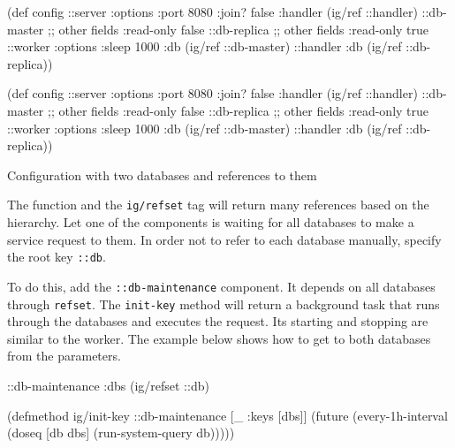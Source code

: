 \begin{listing}[ht!]

\ifnarrow

\begin{english}
  \begin{clojure}
(def config
  {::server {:options {:port 8080
                       :join? false}
             :handler (ig/ref ::handler)}
   ::db-master {;; other fields
                :read-only false}
   ::db-replica {;; other fields
                 :read-only true}
   ::worker {:options {:sleep 1000}
             :db (ig/ref ::db-master)}
   ::handler {:db (ig/ref
                    ::db-replica)}})
  \end{clojure}
\end{english}

\else

\begin{english}
  \begin{clojure}
(def config
  {::server {:options {:port 8080 :join? false}
             :handler (ig/ref ::handler)}
   ::db-master {;; other fields
                :read-only false}
   ::db-replica {;; other fields
                 :read-only true}
   ::worker {:options {:sleep 1000}
             :db (ig/ref ::db-master)}
   ::handler {:db (ig/ref ::db-replica)}})
  \end{clojure}
\end{english}

\fi

\caption{Configuration with two databases and references to them}
\label{fig:config-refset}

\end{listing}

The function and the \verb|ig/refset| tag will return many references based on the hierarchy. Let one of the components is waiting for all databases to make a service request to them. In order not to refer to each database manually, specify the root key \verb|::db|.

To do this, add the \texttt{::db-main\-te\-nance} component. It depends on all databases through \verb|refset|. The \verb|init-key| method will return a background task that runs through the databases and executes the request. Its starting and stopping are similar to the worker. The example below shows how to get to both databases from the parameters.

\ifnarrow

\begin{english}
  \begin{clojure}
{::db-maintenance
 {:dbs (ig/refset ::db)}}

(defmethod ig/init-key ::db-maintenance
  [_ {:keys [dbs]}]
  (future
    (every-1h-interval
      (doseq [db dbs]
        (run-system-query db)))))
  \end{clojure}
\end{english}

